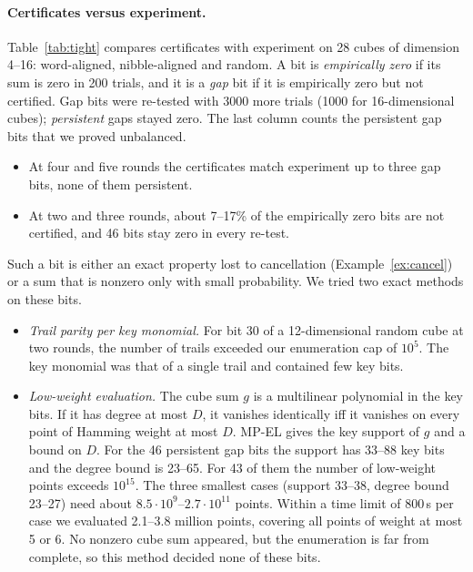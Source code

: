 \documentclass[pdflatex,sn-mathphys-num]{sn-jnl}
\theoremstyle{thmstyleone}
\theoremstyle{thmstylethree}
\theoremstyle{thmstyletwo}
\newcommand{\MPEL}{\textsf{MP-EL}}
\begin{document}
\paragraph{Certificates versus experiment.} Table~\ref{tab:tight} compares certificates with experiment on 28 cubes of dimension 4--16: word-aligned, nibble-aligned and random. A bit is \emph{empirically zero} if its sum is zero in 200 trials, and it is a \emph{gap} bit if it is empirically zero but not certified. Gap bits were re-tested with 3000 more trials (1000 for 16-dimensional cubes); \emph{persistent} gaps stayed zero. The last column counts the persistent gap bits that we proved unbalanced.
\begin{itemize}
\item At four and five rounds the certificates match experiment up to three gap bits, none of them persistent.
\item At two and three rounds, about 7--17\% of the empirically zero bits are not certified, and 46 bits stay zero in every re-test.
\end{itemize}
Such a bit is either an exact property lost to cancellation (Example~\ref{ex:cancel}) or a sum that is nonzero only with small probability. We tried two exact methods on these bits.
\begin{itemize}
\item \emph{Trail parity per key monomial.} For bit 30 of a 12-dimensional random cube at two rounds, the number of trails exceeded our enumeration cap of $10^5$. The key monomial was that of a single trail and contained few key bits.
\item \emph{Low-weight evaluation.} The cube sum $g$ is a multilinear polynomial in the key bits. If it has degree at most $D$, it vanishes identically iff it vanishes on every point of Hamming weight at most $D$. \MPEL{} gives the key support of $g$ and a bound on $D$. For the 46 persistent gap bits the support has 33--88 key bits and the degree bound is 23--65. For 43 of them the number of low-weight points exceeds $10^{15}$. The three smallest cases (support 33--38, degree bound 23--27) need about $8.5\cdot10^9$--$2.7\cdot10^{11}$ points. Within a time limit of 800\,s per case we evaluated 2.1--3.8 million points, covering all points of weight at most 5 or 6. No nonzero cube sum appeared, but the enumeration is far from complete, so this method decided none of these bits.
\end{itemize}
\end{document}
